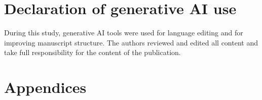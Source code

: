 \documentclass[a4paper,fleqn]{cas-dc}
\begin{document}
\section*{Declaration of generative AI use}

During this study, generative AI tools were used for language editing and for improving manuscript structure. The authors reviewed and edited all content and take full responsibility for the content of the publication.



\section*{Appendices}

% 




\balance


\end{document}
